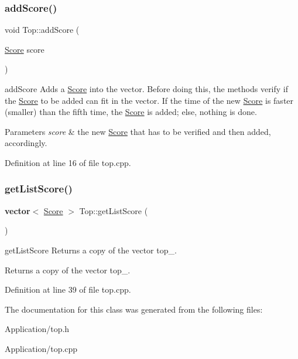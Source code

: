 \subsubsection{\texorpdfstring{add\+Score()}{addScore()}}
{\footnotesize\ttfamily void Top\+::add\+Score (\begin{DoxyParamCaption}\item[{\hyperlink{class_score}{Score}}]{score }\end{DoxyParamCaption})}



add\+Score Adds a \hyperlink{class_score}{Score} into the vector. Before doing this, the methods verify if the \hyperlink{class_score}{Score} to be added can fit in the vector. If the time of the new \hyperlink{class_score}{Score} is faster (smaller) than the fifth time, the \hyperlink{class_score}{Score} is added; else, nothing is done. 


\begin{DoxyParams}{Parameters}
{\em score} & the new \hyperlink{class_score}{Score} that has to be verified and then added, accordingly. \\
\hline
\end{DoxyParams}


Definition at line 16 of file top.\+cpp.

\mbox{\label{class_top_aef6a8f55e1db5c9c39e0978627af63d1}} 
\subsubsection{\texorpdfstring{get\+List\+Score()}{getListScore()}}
{\footnotesize\ttfamily \textbf{ vector}$<$ \hyperlink{class_score}{Score} $>$ Top\+::get\+List\+Score (\begin{DoxyParamCaption}{ }\end{DoxyParamCaption})}



get\+List\+Score Returns a copy of the vector top\+\_\+. 

\begin{DoxyReturn}{Returns}
a copy of the vector top\+\_\+. 
\end{DoxyReturn}


Definition at line 39 of file top.\+cpp.



The documentation for this class was generated from the following files\+:\begin{DoxyCompactItemize}
\item 
Application/top.\+h\item 
Application/top.\+cpp\end{DoxyCompactItemize}
